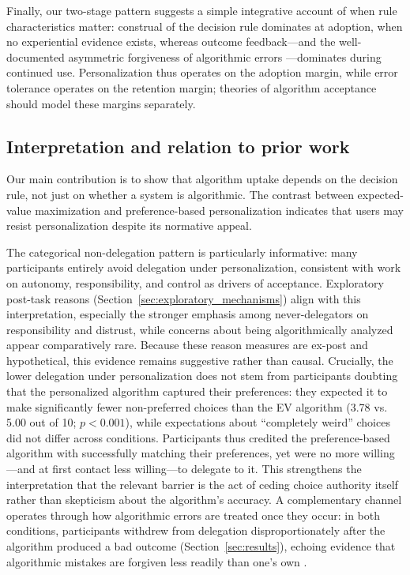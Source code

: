 \documentclass[a4paper, 12pt, fleqn]{article}
\theoremstyle{definition}
\newcommand{\inew}[1]{{\color{blue} #1\color{black}}}
\begin{document}
\inew{Finally, our two-stage pattern suggests a simple integrative account of when rule characteristics matter: construal of the decision rule dominates at adoption, when no experiential evidence exists, whereas outcome feedback---and the well-documented asymmetric forgiveness of algorithmic errors \citep{Dietvorst2015,Renier2021}---dominates during continued use. Personalization thus operates on the adoption margin, while error tolerance operates on the retention margin; theories of algorithm acceptance should model these margins separately.}

\subsection{Interpretation and relation to prior work}
Our main contribution is to show that algorithm uptake depends on the decision rule, not just on whether a system is algorithmic. The contrast between expected-value maximization and preference-based personalization indicates that users may resist personalization despite its normative appeal.

The categorical non-delegation pattern is particularly informative: many participants entirely avoid delegation under personalization, consistent with work on autonomy, responsibility, and control as drivers of acceptance. Exploratory post-task reasons (Section~\ref{sec:exploratory_mechanisms}) align with this interpretation, especially the stronger emphasis among never-delegators on responsibility and distrust, while concerns about being algorithmically analyzed appear comparatively rare. Because these reason measures are ex-post and hypothetical, this evidence remains suggestive rather than causal. Crucially, the lower delegation under personalization does not stem from participants doubting that the personalized algorithm captured their preferences: they expected it to make significantly fewer non-preferred choices than the EV algorithm (3.78 vs. 5.00 out of 10; $p < 0.001$), while expectations about ``completely weird'' choices did not differ across conditions. Participants thus credited the preference-based algorithm with successfully matching their preferences, yet were no more willing---and at first contact less willing---to delegate to it. This strengthens the interpretation that the relevant barrier is the act of ceding choice authority itself rather than skepticism about the algorithm's accuracy. A complementary channel operates through how algorithmic errors are treated once they occur: in both conditions, participants withdrew from delegation disproportionately after the algorithm produced a bad outcome (Section~\ref{sec:results}), echoing evidence that algorithmic mistakes are forgiven less readily than one's own \citep{Dietvorst2018,Renier2021}.
\end{document}
